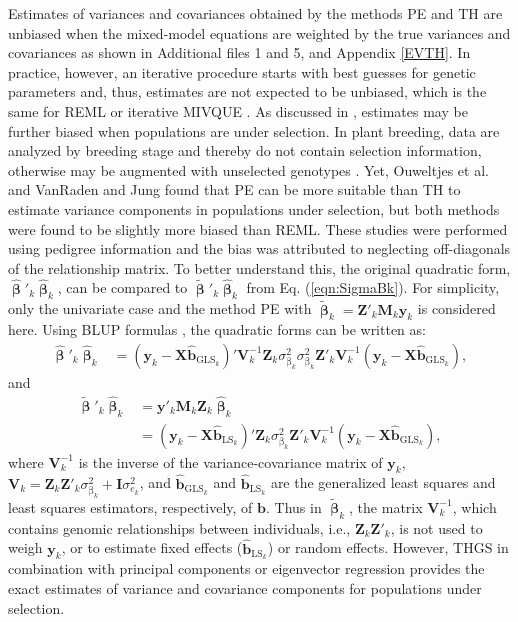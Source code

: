 \documentclass{bmcart}
\begin{document}
Estimates of variances and covariances obtained by the methods PE and TH are unbiased when the mixed-model equations are weighted by the true variances and covariances as shown in Additional files 1 and 5, and Appendix \ref{EVTH}. In practice, however, an iterative procedure starts with best guesses for genetic parameters and, thus, estimates are not expected to be unbiased, which is the same for REML or iterative MIVQUE \cite{Searle1992}. As discussed in \cite{VanRaden}, estimates may be further biased when populations are under selection. In plant breeding, data are analyzed by breeding stage and thereby do not contain selection information, otherwise may be augmented with unselected genotypes \cite{HabierOpt2013,Rincent2017}. Yet, Ouweltjes et al. \cite{Ouweltjes1988} and VanRaden and Jung \cite{VanRaden} found that PE can be more suitable than TH to estimate variance components in populations under selection, but both methods were found to be slightly more biased than REML. These studies were performed using pedigree information and the bias was attributed to neglecting off-diagonals of the relationship matrix. To better understand this, the original quadratic form, $\hat{\mathbf{\upbeta}}'_k\hat{\mathbf{\upbeta}}_k$, can be compared to $\tilde{\mathbf{\upbeta}}'_k\hat{\mathbf{\upbeta}}_k$ from Eq. (\ref{eqn:SigmaBk}). For simplicity, only the univariate case and the method PE with $\tilde{\mathbf{\upbeta}}_k = \mathbf{Z}'_k\mathbf{M}_{k} \mathbf{y}_k$ is considered here. Using BLUP formulas \cite{Searle1992}, the quadratic forms can be written as:
\begin{align}\label{QFORMS1}
    \hat{\mathbf{\upbeta}}'_k\hat{\mathbf{\upbeta}}_k &= (\mathbf{y}_k-\mathbf{X}\hat{\mathbf{b}}_{\textrm{GLS}_k})'\mathbf{V}^{-1}_k\mathbf{Z}_k\sigma^2_{\upbeta_k}\sigma^2_{\upbeta_k}\mathbf{Z}'_k\mathbf{V}^{-1}_k(\mathbf{y}_k-\mathbf{X}\hat{\mathbf{b}}_{\textrm{GLS}_k}),
\end{align}
and
\begin{align}\nonumber
    \tilde{\mathbf{\upbeta}}'_k\hat{\mathbf{\upbeta}}_k &= \mathbf{y}'_k\mathbf{M}_k\mathbf{Z}_k
    \hat{\mathbf{\upbeta}}_k\\\label{QFORMS2}
    &= (\mathbf{y}_k-\mathbf{X}\hat{\mathbf{b}}_{\textrm{LS}_k})'\mathbf{Z}_k\sigma^2_{\upbeta_k}\mathbf{Z}'_k\mathbf{V}^{-1}_k(\mathbf{y}_k-\mathbf{X}\hat{\mathbf{b}}_{\textrm{GLS}_k}),
\end{align}
where $\mathbf{V}^{-1}_k$ is the inverse of the variance-covariance matrix of $\mathbf{y}_k$, $\mathbf{V}_k = \mathbf{Z}_k\mathbf{Z}'_k\sigma^2_{\upbeta_k}+\mathbf{I}\sigma^2_{e_k}$, and $\hat{\mathbf{b}}_{\textrm{GLS}_k}$ and $\hat{\mathbf{b}}_{\textrm{LS}_k}$ are the generalized least squares and least squares estimators, respectively, of $\mathbf{b}$. Thus in $\tilde{\mathbf{\upbeta}}_k$, the matrix $\mathbf{V}^{-1}_k$, which contains genomic relationships between individuals, i.e., $\mathbf{Z}_k\mathbf{Z}'_k$, is not used to weigh $\mathbf{y}_k$, or to estimate fixed effects ($\hat{\mathbf{b}}_{\textrm{LS}_k}$) or random effects. However, THGS in combination with principal components or eigenvector regression provides the exact estimates of variance and covariance components for populations under selection.
\end{document}
